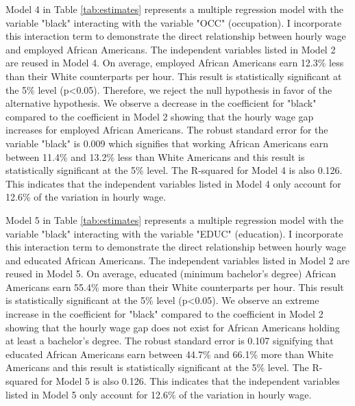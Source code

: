 \documentclass[12pt, english]{article}
\begin{document}
Model 4 in Table \ref{tab:estimates} represents a multiple regression model with the variable "black" interacting with the variable "OCC" (occupation). I incorporate this interaction term to demonstrate the direct relationship between hourly wage and employed African Americans. The independent variables listed in Model 2 are reused in Model 4. On average, employed African Americans earn 12.3\% less than their White counterparts per hour. This result is statistically significant at the 5\% level (p\textless0.05). Therefore, we reject the null hypothesis in favor of the alternative hypothesis. We observe a decrease in the coefficient for "black" compared to the coefficient in Model 2 showing that the hourly wage gap increases for employed African Americans. The robust standard error for the variable "black" is 0.009 which signifies that working African Americans earn between 11.4\% and 13.2\% less than White Americans and this result is statistically significant at the 5\% level. The R-squared for Model 4 is also 0.126. This indicates that the independent variables listed in Model 4 only account for 12.6\% of the variation in hourly wage.

Model 5 in Table \ref{tab:estimates} represents a multiple regression model with the variable "black" interacting with the variable "EDUC" (education). I incorporate this interaction term to demonstrate the direct relationship between hourly wage and educated African Americans. The independent variables listed in Model 2 are reused in Model 5. On average, educated (minimum bachelor's degree) African Americans earn 55.4\% more than their White counterparts per hour. This result is statistically significant at the 5\% level (p\textless0.05). We observe an extreme increase in the coefficient for "black" compared to the coefficient in Model 2 showing that the hourly wage gap does not exist for African Americans holding at least a bachelor's degree. The robust standard error is 0.107 signifying that educated African Americans earn between 44.7\% and 66.1\% more than White Americans and this result is statistically significant at the 5\% level. The R-squared for Model 5 is also 0.126. This indicates that the independent variables listed in Model 5 only account for 12.6\% of the variation in hourly wage.
\end{document}
